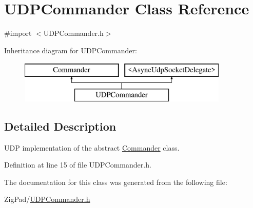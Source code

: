 \hypertarget{interface_u_d_p_commander}{
\section{UDPCommander Class Reference}
\label{interface_u_d_p_commander}
}


{\ttfamily \#import $<$UDPCommander.h$>$}

Inheritance diagram for UDPCommander:\begin{figure}[H]
\begin{center}
\leavevmode
\includegraphics[height=2.000000cm]{interface_u_d_p_commander}
\end{center}
\end{figure}


\subsection{Detailed Description}
UDP implementation of the abstract \hyperlink{interface_commander}{Commander} class. 

Definition at line 15 of file UDPCommander.h.



The documentation for this class was generated from the following file:\begin{DoxyCompactItemize}
\item 
ZigPad/\hyperlink{_u_d_p_commander_8h}{UDPCommander.h}\end{DoxyCompactItemize}

